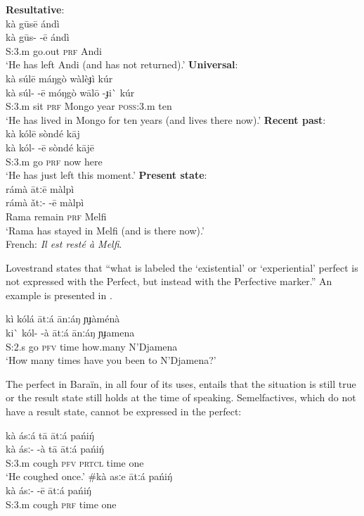 \ea
\ea  \textbf{Resultative}:\\
\glll kà  gūsē    ándì\\
kà  gūs-  -ē  ándì\\
S:3.m  go.out  \textsc{prf}  Andi\\
\glt ‘He has left Andi (and has not returned).’
\ex   \textbf{Universal}:\\
\glll kà  súlē    máŋgò  wàlèɟì    kúr\\
kà  súl-  -ē  móŋgò  wālō  -ɟi\`{}   kúr\\
S:3.m  sit  \textsc{prf}  Mongo  year  \textsc{poss}:3.m  ten\\
\glt ‘He has lived in Mongo for ten years (and lives there now).’
\ex   \textbf{Recent past}:\\
\glll kà  kólē    sòndé  kāj\\
kà  kól-  -ē  sòndé  kājē\\
S:3.m  go  \textsc{prf}  now  here\\
\glt ‘He has just left this moment.’
\ex   \textbf{Present state}:\\
\glll rámà  ātːē    màlpì\\
rámà  ǎtː-  -ē  màlpì\\
Rama  remain  \textsc{prf}  Melfi\\
\glt ‘Rama has stayed in Melfi (and is there now).’\\
French: \textit{Il est resté à Melfi}.
\z \z


Lovestrand states that “what is labeled the ‘existential’ or ‘experiential’ perfect is not expressed with the Perfect, but instead with the Perfective marker.” An example is presented in .


\ea
\glll kì  kólá    ātːá  ānːáŋ  ɲɟàménà\\
ki\`{}   kól-  -à  ātːá  ānːáŋ  ɲɟamena\\
S:2.s  go  \textsc{pfv}  time  how.many  N’Djamena\\
\glt ‘How many times have you been to N’Djamena?’
\z


The perfect in Baraïn, in all four of its uses, entails that the situation is still true or the result state still holds at the time of speaking. Semelfactives, which do not have a result state, cannot be expressed in the perfect:


\ea
\ea \glll  kà  ásːá    tā  ātːá  pańi\'{ŋ}\\
kà  ásː-  -à  tā  ātːá  pańi\'{ŋ}\\
S:3.m  cough  \textsc{pfv}  \textsc{prtcl}  time  one\\
\glt ‘He coughed once.’
\ex \glll  \#kà  asːe    ātːá  pańi\'{ŋ}\\
  kà  ásː-  -ē  ātːá  pańi\'{ŋ}\\
S:3.m  cough  \textsc{prf}  time  one\\
\z \z


